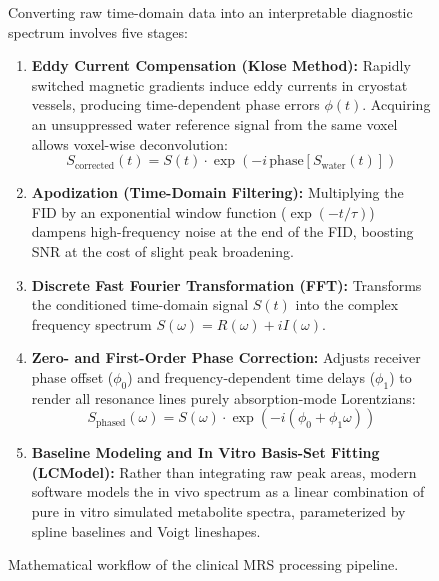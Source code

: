 \documentclass[11pt,a4paper]{article}
\begin{document}
\begin{figure}[htbp]
\centering
\begin{tcolorbox}[colback=blue!5!white,colframe=blue!60!black,title=\textbf{In Vivo Spectral Processing Pipeline},width=\linewidth]
\small
Converting raw time-domain data into an interpretable diagnostic spectrum involves five stages:
\begin{enumerate}[leftmargin=1.5em]
    \item \textbf{Eddy Current Compensation (Klose Method):} Rapidly switched magnetic gradients induce eddy currents in cryostat vessels, producing time-dependent phase errors $\phi(t)$. Acquiring an unsuppressed water reference signal from the same voxel allows voxel-wise deconvolution:
    \begin{equation}
        S_{\text{corrected}}(t) = S(t) \cdot \exp\left( -i \, \text{phase}[S_{\text{water}}(t)] \right)
    \end{equation}
    \item \textbf{Apodization (Time-Domain Filtering):} Multiplying the FID by an exponential window function ($\exp(-t/\tau)$) dampens high-frequency noise at the end of the FID, boosting SNR at the cost of slight peak broadening.
    \item \textbf{Discrete Fast Fourier Transformation (FFT):} Transforms the conditioned time-domain signal $S(t)$ into the complex frequency spectrum $S(\omega) = R(\omega) + i I(\omega)$.
    \item \textbf{Zero- and First-Order Phase Correction:} Adjusts receiver phase offset ($\phi_0$) and frequency-dependent time delays ($\phi_1$) to render all resonance lines purely absorption-mode Lorentzians:
    \begin{equation}
        S_{\text{phased}}(\omega) = S(\omega) \cdot \exp\left( -i (\phi_0 + \phi_1 \omega) \right)
    \end{equation}
    \item \textbf{Baseline Modeling and In Vitro Basis-Set Fitting (LCModel):} Rather than integrating raw peak areas, modern software models the in vivo spectrum as a linear combination of pure in vitro simulated metabolite spectra, parameterized by spline baselines and Voigt lineshapes.
\end{enumerate}
\end{tcolorbox}
\caption{Mathematical workflow of the clinical MRS processing pipeline.}
\label{fig:spectral_pipeline}
\end{figure}
\end{document}
